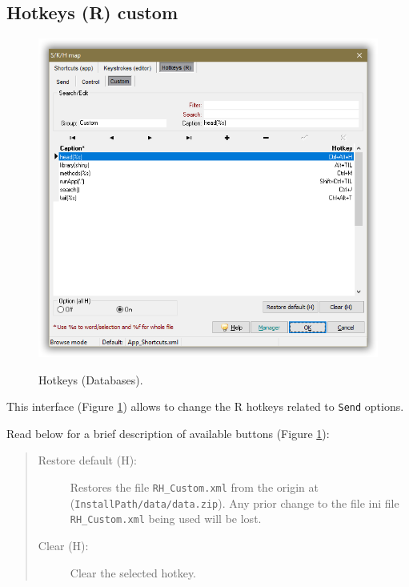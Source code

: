 \subsection{Hotkeys (R) custom}

\begin{figure}[H]
  \includegraphics[scale=0.35]{./res/skh_map_rh_custom_dlg.png}\\
  \caption{Hotkeys (Databases).}
  \label{fig:rh_custom_dlg}
\end{figure}

This interface
(Figure \ref{fig:rh_custom_dlg})
allows to change the R hotkeys related to \texttt{Send} options.

Read below for a brief description of available buttons (Figure \ref{fig:rh_custom_dlg}):

\begin{quote}
  \begin{footnotesize}
    \begin{description}
      \item[Restore default (H):]
        Restores the file \texttt{RH\_Custom.xml} from the origin at
        (\texttt{InstallPath/data/data.zip}). Any prior change to the file ini file
        \texttt{RH\_Custom.xml} being used will be lost.
      \item[Clear (H):]
        Clear the selected hotkey.
    \end{description}
  \end{footnotesize}
\end{quote}


